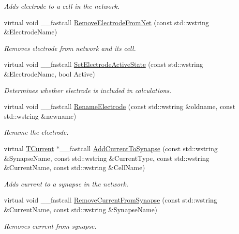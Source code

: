 \begin{DoxyCompactItemize}
\begin{DoxyCompactList}\small\item\em Adds electrode to a cell in the network. \end{DoxyCompactList}\item 
virtual void \+\_\+\+\_\+fastcall \hyperlink{class_t_network_a03936ad02ae65bdd73645b2e22c5b796}{Remove\+Electrode\+From\+Net} (const std\+::wstring \&Electrode\+Name)
\begin{DoxyCompactList}\small\item\em Removes electrode from network and its cell. \end{DoxyCompactList}\item 
virtual void \+\_\+\+\_\+fastcall \hyperlink{class_t_network_a509f7d39290fa7c82e613d5aae1498ce}{Set\+Electrode\+Active\+State} (const std\+::wstring \&Electrode\+Name, bool Active)
\begin{DoxyCompactList}\small\item\em Determines whether electrode is included in calculations. \end{DoxyCompactList}\item 
virtual void \+\_\+\+\_\+fastcall \hyperlink{class_t_network_a36ac85343172b38901261fe9ca0ede7e}{Rename\+Electrode} (const std\+::wstring \&oldname, const std\+::wstring \&newname)
\begin{DoxyCompactList}\small\item\em Rename the electrode. \end{DoxyCompactList}\item 
virtual \hyperlink{class_t_current}{T\+Current} $\ast$\+\_\+\+\_\+fastcall \hyperlink{class_t_network_afcb6c9ba3cea871b214cac5271776f03}{Add\+Current\+To\+Synapse} (const std\+::wstring \&Synapse\+Name, const std\+::wstring \&Current\+Type, const std\+::wstring \&Current\+Name, const std\+::wstring \&Cell\+Name)
\begin{DoxyCompactList}\small\item\em Adds current to a synapse in the network. \end{DoxyCompactList}\item 
virtual void \+\_\+\+\_\+fastcall \hyperlink{class_t_network_aee6565f15d005fa3daccaefe215b0946}{Remove\+Current\+From\+Synapse} (const std\+::wstring \&Current\+Name, const std\+::wstring \&Synapse\+Name)
\begin{DoxyCompactList}\small\item\em Removes current from synapse. \end{DoxyCompactList}\item 

\end{DoxyCompactItemize}
